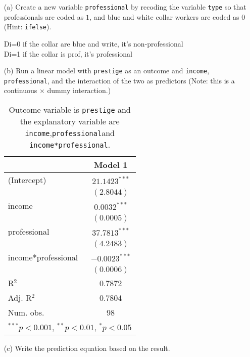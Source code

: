 \documentclass[12pt,letterpaper]{article}
\begin{document}
\newpage
\begin{enumerate}
	
	\item [(a)]
	Create a new variable \texttt{professional} by recoding the variable \texttt{type} so that professionals are coded as $1$, and blue and white collar workers are coded as $0$ (Hint: \texttt{ifelse}).
	 
	Di=0 if the collar are blue and write, it's non-professional\\
	Di=1 if the collar is prof, it's professional
	\vspace{0.25cm}
	
	
	\item [(b)]
	Run a linear model with \texttt{prestige} as an outcome and \texttt{income}, \texttt{professional}, and the interaction of the two as predictors (Note: this is a continuous $\times$ dummy interaction.)
	
\begin{table}[htbp]
	\centering
	\caption{\footnotesize{Outcome variable is \texttt{prestige} and the explanatory variable are \texttt{income},\texttt{professional}and \texttt{income*professional}.}} %
	\label{table:coefficients}
	\begin{tabular}{l c }
		\hline
		& Model 1 \\
		\hline
		(Intercept) & $21.1423^{***}$ \\
		& $(2.8044)$     \\
		income     & $0.0032^{***}$ \\
		& $(0.0005)$     \\
		professional     & $37.7813^{***}$ \\
		& $(4.2483)$     \\
		income*professional     & $-0.0023^{***}$ \\
		& $(0.0006)$     \\
		\hline
		R$^2$       & 0.7872       \\
		Adj. R$^2$  & 0.7804        \\
		Num. obs.   & 98          \\
		\hline
		\multicolumn{2}{l}{\scriptsize{$^{***}p<0.001$, $^{**}p<0.01$, $^*p<0.05$}}
	\end{tabular}
\end{table}


	\vspace{0.25cm}
	\item [(c)]
	\vspace{0.25cm}
	Write the prediction equation based on the result.\\
	

\end{enumerate}
\end{document}

